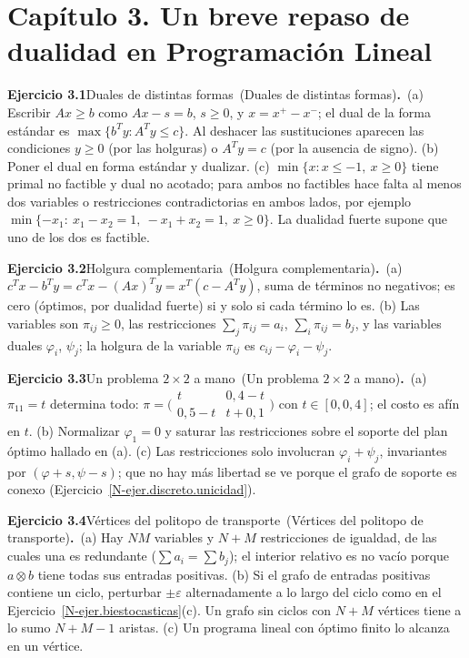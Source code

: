 \documentclass[11pt,a4paper]{amsart}
\newcommand{\ve}{\varepsilon}
\theoremstyle{remark}
\theoremstyle{definition}
\numberwithin{subsection}{section}
\numberwithin{equation}{section}
\newcommand{\ejlabel}[2]{\par\medskip\noindent\textbf{Ejercicio #1}\ifx\relax#2\relax\else\ (#2)\fi\textbf{.}\ }
\begin{document}
\section*{Capítulo 3. Un breve repaso de dualidad en Programación Lineal}
\ejlabel{3.1}{Duales de distintas formas}(a) Escribir $Ax\ge b$ como $Ax-s=b$, $s\ge0$, y $x=x^+-x^-$; el dual de la forma estándar es $\max\{b^Ty:A^Ty\le c\}$. Al deshacer las sustituciones aparecen las condiciones $y\ge0$ (por las holguras) o $A^Ty=c$ (por la ausencia de signo). (b) Poner el dual en forma estándar y dualizar. (c) $\min\{x:x\le-1,\ x\ge0\}$ tiene primal no factible y dual no acotado; para ambos no factibles hace falta al menos dos variables o restricciones contradictorias en ambos lados, por ejemplo $\min\{-x_1:\ x_1-x_2=1,\ -x_1+x_2=1,\ x\ge0\}$. La dualidad fuerte supone que uno de los dos es factible.

\ejlabel{3.2}{Holgura complementaria}(a) $c^Tx-b^Ty=c^Tx-(Ax)^Ty=x^T(c-A^Ty)$, suma de términos no negativos; es cero (óptimos, por dualidad fuerte) si y solo si cada término lo es. (b) Las variables son $\pi_{ij}\ge0$, las restricciones $\sum_j\pi_{ij}=a_i$, $\sum_i\pi_{ij}=b_j$, y las variables duales $\varphi_i$, $\psi_j$; la holgura de la variable $\pi_{ij}$ es $c_{ij}-\varphi_i-\psi_j$.

\ejlabel{3.3}{Un problema $2\times2$ a mano}(a) $\pi_{11}=t$ determina todo: $\pi=\bigl(\begin{smallmatrix}t&0{,}4-t\\0{,}5-t&t+0{,}1\end{smallmatrix}\bigr)$ con $t\in[0,0{,}4]$; el costo es afín en $t$. (b) Normalizar $\varphi_1=0$ y saturar las restricciones sobre el soporte del plan óptimo hallado en (a). (c) Las restricciones solo involucran $\varphi_i+\psi_j$, invariantes por $(\varphi+s,\psi-s)$; que no hay más libertad se ve porque el grafo de soporte es conexo (Ejercicio~\ref{N-ejer.discreto.unicidad}).

\ejlabel{3.4}{Vértices del politopo de transporte}(a) Hay $NM$ variables y $N+M$ restricciones de igualdad, de las cuales una es redundante ($\sum a_i=\sum b_j$); el interior relativo es no vacío porque $a\otimes b$ tiene todas sus entradas positivas. (b) Si el grafo de entradas positivas contiene un ciclo, perturbar $\pm\ve$ alternadamente a lo largo del ciclo como en el Ejercicio~\ref{N-ejer.biestocasticas}(c). Un grafo sin ciclos con $N+M$ vértices tiene a lo sumo $N+M-1$ aristas. (c) Un programa lineal con óptimo finito lo alcanza en un vértice.
\end{document}

